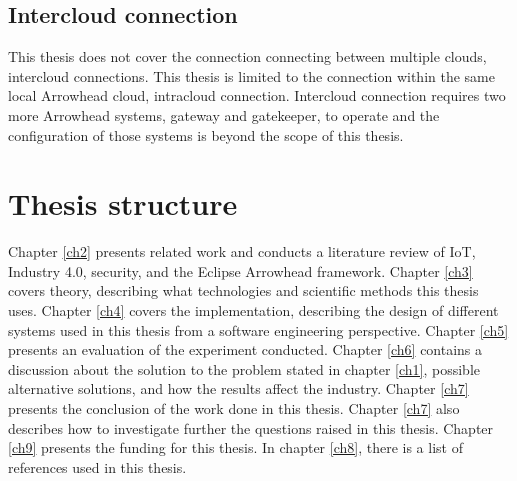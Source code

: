 \subsection{Intercloud connection}
This thesis does not cover the connection connecting between multiple clouds, intercloud connections. 
This thesis is limited to the connection within the same local Arrowhead cloud, intracloud connection.  
Intercloud connection requires two more Arrowhead systems, gateway and gatekeeper, to operate and the configuration of those systems is beyond the scope of this thesis.

\section{Thesis structure}
Chapter \ref{ch2} presents related work and conducts a literature review of IoT, Industry 4.0, security, and the Eclipse Arrowhead framework.
Chapter \ref{ch3} covers theory, describing what technologies and scientific methods this thesis uses.
Chapter \ref{ch4} covers the implementation, describing the design of different systems used in this thesis from a software engineering perspective.
Chapter \ref{ch5} presents an evaluation of the experiment conducted.
Chapter \ref{ch6} contains a discussion about the solution to the problem stated in chapter \ref{ch1}, possible alternative solutions, and how the results affect the industry.
Chapter \ref{ch7} presents the conclusion of the work done in this thesis. Chapter \ref{ch7} also describes how to investigate further the questions raised in this thesis.
Chapter \ref{ch9} presents the funding for this thesis. 
In chapter \ref{ch8}, there is a list of references used in this thesis.
